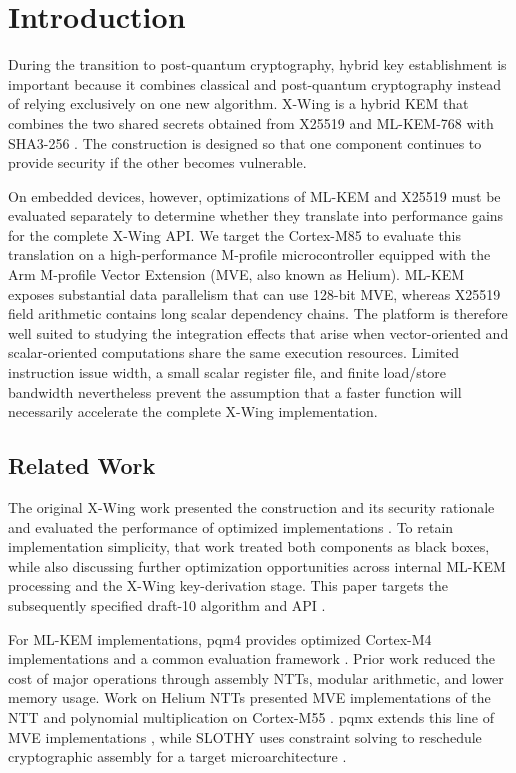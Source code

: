 \documentclass[runningheads,orivec]{llncs}
\newcommand{\xwing}{X-Wing}
\begin{document}
\section{Introduction}\label{sec:introduction}

During the transition to post-quantum cryptography, hybrid key establishment is
important because it combines classical and post-quantum cryptography instead
of relying exclusively on one new algorithm. \xwing{} is a hybrid KEM that
combines the two shared secrets obtained from X25519 and ML-KEM-768 with
SHA3-256 \cite{XWing24,XWingDraft10}. The construction is designed so that one
component continues to provide security if the other becomes vulnerable.

On embedded devices, however, optimizations of ML-KEM and X25519 must be
evaluated separately to determine whether they translate into performance gains
for the complete \xwing{} API. We target the Cortex-M85 to evaluate this
translation on a high-performance M-profile microcontroller equipped with the
Arm M-profile Vector Extension (MVE, also known as Helium). ML-KEM exposes
substantial data parallelism that can use 128-bit MVE, whereas X25519 field
arithmetic contains long scalar dependency chains. The platform is therefore
well suited to studying the integration effects that arise when vector-oriented
and scalar-oriented computations share the same execution resources. Limited
instruction issue width, a small scalar register file, and finite load/store
bandwidth nevertheless prevent the assumption that a faster function will
necessarily accelerate the complete \xwing{} implementation.

\subsection{Related Work}

The original \xwing{} work presented the construction and its security rationale
and evaluated the performance of optimized implementations \cite{XWing24}. To
retain implementation simplicity, that work treated both components as black
boxes, while also discussing further optimization opportunities across internal
ML-KEM processing and the \xwing{} key-derivation stage. This paper targets the
subsequently specified draft-10 algorithm and API \cite{XWingDraft10}.

For ML-KEM implementations, pqm4 provides optimized Cortex-M4 implementations
and a common evaluation framework \cite{pqm4}. Prior work reduced the cost of
major operations through assembly NTTs, modular arithmetic, and lower memory
usage. Work on Helium NTTs presented MVE implementations of the NTT and
polynomial multiplication on Cortex-M55 \cite{HeliumNTT22}. pqmx extends this
line of MVE implementations \cite{pqmx}, while SLOTHY uses constraint solving
to reschedule cryptographic assembly for a target microarchitecture
\cite{Slothy22,SlothyM7_25}.
\end{document}
